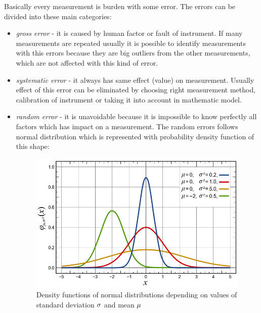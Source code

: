 \documentclass[a4paper,12pt]{article}
\newcommand{\escal}[1]{
{\it #1}
}
\newcommand{\term}[1]{
{\it #1}%
}
\begin{document}
Basically every measurement is burden with some error. The errors can be divided into these main categories:  
\begin{itemize}
\item \term{gross error} - it is caused by human factor or fault of instrument. If many measurements are repeated
usually it is possible to identify measurements with this errors because they are big outliers from the other measurements, which are not affected with this 
kind of error.
\item \term{systematic error} - it always has same effect (value) on measurement.  Usually effect of this error can be 
eliminated by choosing right measurement method, calibration of instrument or taking it into account in  mathematic model.
\item \term{random error} - it is unavoidable because it is impossible to know perfectly all factors which has impact 
on a measurement. The random errors follows normal distribution which is represented with probability density function of this shape:


\begin{figure}[h]
    \centering
   \includegraphics[scale=0.4]{figures/normal_dist.png}
    \caption{Density functions of normal distributions depending on values of standard deviation 
$\escal{\sigma}$ and mean $\escal{\mu}$ \cite{inductiveload2008selection}}
    \label{fig:sample_figure}
\end{figure}




\end{itemize}
\end{document}
